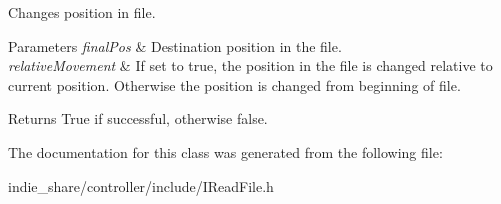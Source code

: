 Changes position in file. 


\begin{DoxyParams}{Parameters}
{\em final\+Pos} & Destination position in the file. \\
\hline
{\em relative\+Movement} & If set to true, the position in the file is changed relative to current position. Otherwise the position is changed from beginning of file. \\
\hline
\end{DoxyParams}
\begin{DoxyReturn}{Returns}
True if successful, otherwise false. 
\end{DoxyReturn}


The documentation for this class was generated from the following file\+:\begin{DoxyCompactItemize}
\item 
indie\+\_\+share/controller/include/I\+Read\+File.\+h\end{DoxyCompactItemize}
